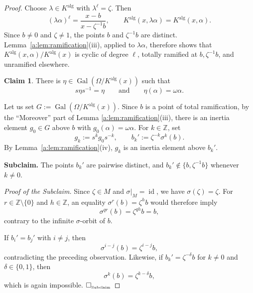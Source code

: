 \documentclass[11pt,a4paper]{amsart}
\theoremstyle{definition}
\newtheorem{claim}{Claim}
\newenvironment{claimproof}[1][Proof of Claim \theclaim.]
 {%
	\proof[#1]%
\renewcommand*\qedsymbol{$\square$\tiny{Claim \theclaim}}
}
{%
	\endproof%
}
\newcommand{\Z}{\mathbb Z}
\newcommand{\alg}{\mathrm{alg}}
\DeclareMathOperator{\Gal}{Gal}
\DeclareMathOperator{\id}{id}
\begin{document}
\begin{proof}
Choose $\lambda\in K^{\alg}$ with $\lambda^\ell=\zeta$.
Then
\[
(\lambda\alpha)^\ell
=\frac{x-b}{x-\zeta^{-1}b},
\qquad
K^{\alg}(x,\lambda\alpha)=K^{\alg}(x,\alpha).
\]
Since $b\ne0$ and $\zeta\ne1$, the points $b$ and
$\zeta^{-1}b$ are distinct.
Lemma~\ref{a:lem:ramification}(iii), applied to
$\lambda\alpha$, therefore shows that
$K^{\alg}(x,\alpha)/K^{\alg}(x)$ is cyclic of degree $\ell$,
totally ramified at $b,\zeta^{-1}b$, and unramified elsewhere.
\begin{claim}\label{cl2}
There is $\eta\in \Gal(\Omega/K^\alg(x))$ such that
\[
s\eta s^{-1}=\eta\qquad \text{and}\qquad \eta(\alpha)=\omega\alpha.
\]
\end{claim}
\begin{claimproof}
Let us set $G:=\Gal(\Omega/K^\alg(x))$. Since $b$ is a point of total ramification, by the ``Moreover'' part of Lemma \ref{a:lem:ramification}(iii), there is  an inertia element $g_0\in G$ above $b$ with
$g_0(\alpha)=\omega\alpha$. For $k\in\Z$, set
\[
g_k:=s^kg_0s^{-k},\qquad b_k':=\zeta^{-k}\sigma^k(b).
\]
By Lemma~\ref{a:lem:ramification}(iv), $g_k$ is an inertia
element above $b_k'$.

\smallskip
\noindent\textbf{Subclaim.}
The points $b_k'$ are pairwise distinct, and
$b_k'\notin\{b,\zeta^{-1}b\}$ whenever $k\ne0$.

\smallskip
\noindent\emph{Proof of the Subclaim.}
Since $\zeta\in M$ and $\sigma|_M=\id$, we have
$\sigma(\zeta)=\zeta$.
For $r\in\Z\setminus\{0\}$ and $h\in\Z$, an equality
$\sigma^r(b)=\zeta^h b$ would therefore imply
\[
\sigma^{qr}(b)=\zeta^{qh}b=b,
\]
contrary to the infinite $\sigma$-orbit of $b$.

If $b_i'=b_j'$ with $i\ne j$, then
\[
\sigma^{i-j}(b)=\zeta^{i-j}b,
\]
contradicting the preceding observation.
Likewise, if $b_k'=\zeta^{-\delta}b$ for
$k\ne0$ and $\delta\in\{0,1\}$, then
\[
\sigma^k(b)=\zeta^{k-\delta}b,
\]
which is again impossible.
\hfill$\square_{\text{\tiny Subclaim}}$


\end{claimproof}
\end{proof}
\end{document}
